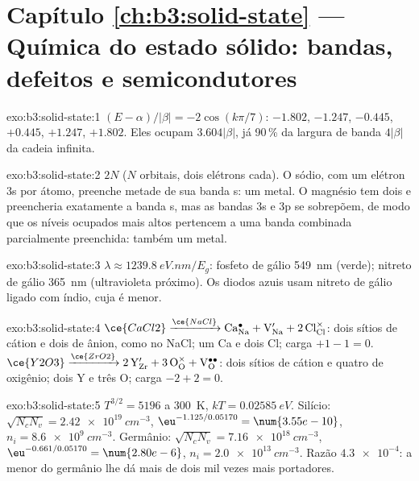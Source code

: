 \section*{Capítulo \ref{ch:b3:solid-state} --- Química do estado sólido: bandas, defeitos e semicondutores}

\begin{solution}{exo:b3:solid-state:1}
$(E - \alpha)/|\beta| = -2\cos(k\pi/7)$: $-1.802$, $-1.247$, $-0.445$, $+0.445$, $+1.247$, $+1.802$. Eles ocupam
$3.604|\beta|$, já 90\,\% da largura de banda $4|\beta|$ da cadeia infinita.
\end{solution}

\begin{solution}{exo:b3:solid-state:2}
$2N$ ($N$ orbitais, dois elétrons cada). O sódio, com um elétron 3s por átomo, preenche metade
de sua banda s: um metal. O magnésio tem dois e preencheria exatamente a banda s,
mas as bandas 3s e 3p se sobrepõem, de modo que os níveis ocupados mais altos pertencem a uma
banda combinada parcialmente preenchida: também um metal.
\end{solution}

\begin{solution}{exo:b3:solid-state:3}
$\lambda \approx \qty{1239.8}{eV.nm}/E_g$: fosfeto de gálio \qty{549}{nm} (verde); nitreto de gálio \qty{365}{nm}
(ultravioleta próximo). Os diodos azuis usam nitreto de gálio ligado com índio, cuja
 é menor.
\end{solution}

\begin{solution}{exo:b3:solid-state:4}
$\ce{CaCl2} \xrightarrow{\ce{NaCl}} \mathrm{Ca_{Na}^{\bullet} + V_{Na}' + 2\,Cl_{Cl}^{\times}}$: dois sítios de cátion e dois de ânion, como no NaCl; um Ca e
dois Cl; carga $+1 - 1 = 0$. $\ce{Y2O3} \xrightarrow{\ce{ZrO2}} \mathrm{2\,Y_{Zr}' + 3\,O_O^{\times} + V_O^{\bullet\bullet}}$: dois sítios de cátion e quatro de oxigênio; dois Y
e três O; carga $-2 + 2 = 0$.
\end{solution}

\begin{solution}{exo:b3:solid-state:5}
$T^{3/2} = 5196$ a \qty{300}{K}, $kT = \qty{0.02585}{eV}$. Silício: $\sqrt{N_cN_v} = \qty{2.42e19}{cm^{-3}}$, $\eu^{-1.125/0.05170} = \num{3.55e-10}$,
$n_i = \qty{8.6e9}{cm^{-3}}$. Germânio: $\sqrt{N_cN_v} = \qty{7.16e18}{cm^{-3}}$, $\eu^{-0.661/0.05170} = \num{2.80e-6}$, $n_i = \qty{2.0e13}{cm^{-3}}$. Razão
$\num{4.3e-4}$: a  menor do germânio lhe dá mais de dois mil vezes mais
portadores.
\end{solution}

